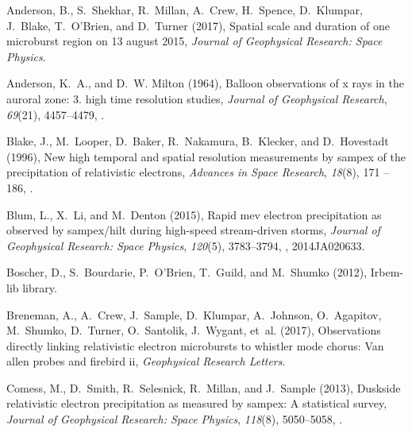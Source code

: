 \documentclass[draft, linenumbers]{agujournal}
\begin{document}
\begin{thebibliography}{49}
Anderson, B., S.~Shekhar, R.~Millan, A.~Crew, H.~Spence, D.~Klumpar, J.~Blake,
  T.~O'Brien, and D.~Turner (2017), Spatial scale and duration of one
  microburst region on 13 august 2015, \textit{Journal of Geophysical Research:
  Space Physics}.

Anderson, K.~A., and D.~W. Milton (1964), Balloon observations of x rays in the
  auroral zone: 3. high time resolution studies, \textit{Journal of Geophysical
  Research}, \textit{69}(21), 4457--4479, .

Blake, J., M.~Looper, D.~Baker, R.~Nakamura, B.~Klecker, and D.~Hovestadt
  (1996), New high temporal and spatial resolution measurements by sampex of
  the precipitation of relativistic electrons, \textit{Advances in Space
  Research}, \textit{18}(8), 171 -- 186,
  .

Blum, L., X.~Li, and M.~Denton (2015), Rapid mev electron precipitation as
  observed by sampex/hilt during high-speed stream-driven storms,
  \textit{Journal of Geophysical Research: Space Physics}, \textit{120}(5),
  3783--3794, , 2014JA020633.

Boscher, D., S.~Bourdarie, P.~O'Brien, T.~Guild, and M.~Shumko (2012),
  Irbem-lib library.

Breneman, A., A.~Crew, J.~Sample, D.~Klumpar, A.~Johnson, O.~Agapitov,
  M.~Shumko, D.~Turner, O.~Santolik, J.~Wygant, et~al. (2017), Observations
  directly linking relativistic electron microbursts to whistler mode chorus:
  Van allen probes and firebird ii, \textit{Geophysical Research Letters}.

Comess, M., D.~Smith, R.~Selesnick, R.~Millan, and J.~Sample (2013), Duskside
  relativistic electron precipitation as measured by sampex: A statistical
  survey, \textit{Journal of Geophysical Research: Space Physics},
  \textit{118}(8), 5050--5058, .


\end{thebibliography}
\end{document}
